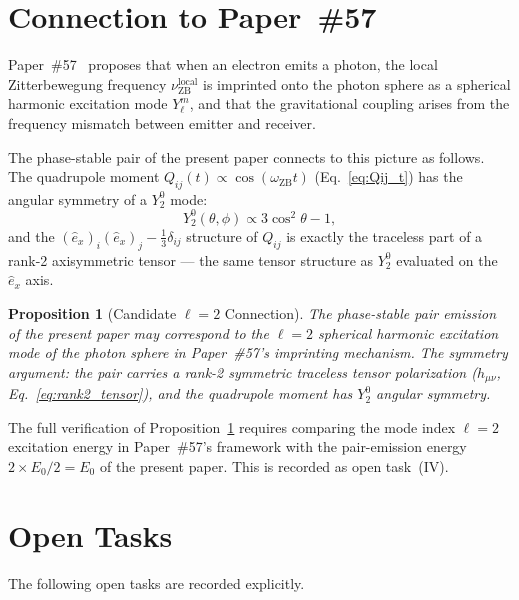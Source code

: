 \documentclass[%
 reprint, amsmath,amssymb, aps, prb, ]{revtex4-2}
\numberwithin{equation}{section}
\newtheorem{proposition}[theorem]{Proposition}
\newcommand{\omZB}{\omega_{\text{ZB}}}
\newcommand{\ehat}[1]{\hat{e}_{#1}}
\begin{document}
\section{\texorpdfstring{Connection to Paper~\#57}{Connection to Paper 57}}
\label{sec:p57}

Paper~\#57~\cite{hanamura57} proposes that when an electron emits a photon, the local Zitterbewegung frequency $\nu_\mathrm{ZB}^\mathrm{local}$ is imprinted onto the photon sphere as a spherical harmonic excitation mode $Y_\ell^m$, and that the gravitational coupling arises from the frequency mismatch between emitter and receiver.

The phase-stable pair of the present paper connects to this picture as follows.
The quadrupole moment $Q_{ij}(t) \propto \cos(\omZB t)$ (Eq.~\eqref{eq:Qij_t}) has the angular symmetry of a $Y_2^0$ mode:
\begin{equation}
Y_2^0(\theta,\phi) \propto 3\cos^2\theta - 1,
\label{eq:Y20}
\end{equation}
and the $(\ehat{x})_i(\ehat{x})_j - \frac{1}{3}\delta_{ij}$ structure of $Q_{ij}$ is exactly the traceless part of a rank-2 axisymmetric tensor --- the same tensor structure as $Y_2^0$ evaluated on the $\ehat{x}$ axis.

\begin{proposition}[Candidate $\ell = 2$ Connection]
\label{prop:ell2}
The phase-stable pair emission of the present paper may correspond to the $\ell = 2$ spherical harmonic excitation mode of the photon sphere in Paper~\#57's imprinting mechanism.
The symmetry argument: the pair carries a rank-2 symmetric traceless tensor polarization ($h_{\mu\nu}$, Eq.~\eqref{eq:rank2_tensor}), and the quadrupole moment has $Y_2^0$ angular symmetry.
\end{proposition}

The full verification of Proposition~\ref{prop:ell2} requires comparing the mode index $\ell = 2$ excitation energy in Paper~\#57's framework with the pair-emission energy $2 \times E_0/2 = E_0$ of the present paper.
This is recorded as open task~(IV).

\section{Open Tasks}
\label{sec:open}

The following open tasks are recorded explicitly.
\end{document}
